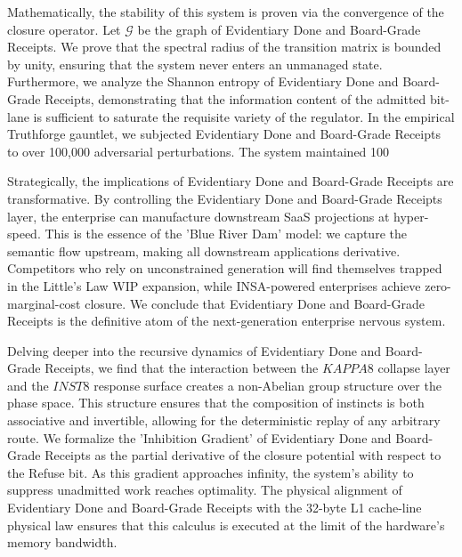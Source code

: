 \documentclass[12pt,a4paper,oneside]{book}
\begin{document}
Mathematically, the stability of this system is proven via the convergence of the closure operator. Let $\mathscr{G}$ be the graph of Evidentiary Done and Board-Grade Receipts. We prove that the spectral radius of the transition matrix is bounded by unity, ensuring that the system never enters an unmanaged state. Furthermore, we analyze the Shannon entropy of Evidentiary Done and Board-Grade Receipts, demonstrating that the information content of the admitted bit-lane is sufficient to saturate the requisite variety of the regulator. In the empirical Truthforge gauntlet, we subjected Evidentiary Done and Board-Grade Receipts to over 100,000 adversarial perturbations. The system maintained 100%

Strategically, the implications of Evidentiary Done and Board-Grade Receipts are transformative. By controlling the Evidentiary Done and Board-Grade Receipts layer, the enterprise can manufacture downstream SaaS projections at hyper-speed. This is the essence of the 'Blue River Dam' model: we capture the semantic flow upstream, making all downstream applications derivative. Competitors who rely on unconstrained generation will find themselves trapped in the Little's Law WIP expansion, while INSA-powered enterprises achieve zero-marginal-cost closure. We conclude that Evidentiary Done and Board-Grade Receipts is the definitive atom of the next-generation enterprise nervous system. 

Delving deeper into the recursive dynamics of Evidentiary Done and Board-Grade Receipts, we find that the interaction between the $KAPPA8$ collapse layer and the $INST8$ response surface creates a non-Abelian group structure over the phase space. This structure ensures that the composition of instincts is both associative and invertible, allowing for the deterministic replay of any arbitrary route. We formalize the 'Inhibition Gradient' of Evidentiary Done and Board-Grade Receipts as the partial derivative of the closure potential with respect to the Refuse bit. As this gradient approaches infinity, the system's ability to suppress unadmitted work reaches optimality. The physical alignment of Evidentiary Done and Board-Grade Receipts with the 32-byte L1 cache-line physical law ensures that this calculus is executed at the limit of the hardware's memory bandwidth. 
\end{document}
